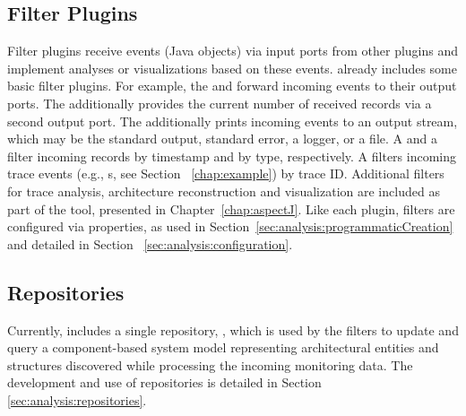 \subsection{Filter Plugins}

Filter plugins receive events (Java objects) via input ports from other %
plugins and implement analyses or visualizations based on these events. %
\Kieker{} already includes some basic filter plugins. For example, the %
 and   forward incoming events %
to their output ports. The  additionally provides the %
current number of received records via a second output port. The  %
additionally prints incoming events to an output stream, which may be %
the standard output, standard error, a logger, or a file. %
A  and a  filter incoming records by %
timestamp and by type, respectively. A  filters incoming %
trace events (e.g., s, see Section~%
\ref{chap:example}) by trace ID. Additional filters for trace analysis, %
architecture reconstruction and visualization are included as part of %
the \KiekerTraceAnalysis{} tool, presented in Chapter~\ref{chap:aspectJ}. %
Like each plugin, filters are configured %
via properties, as used in Section~\ref{sec:analysis:programmaticCreation} and %
detailed in Section~%
\ref{sec:analysis:configuration}. %

%

%


\subsection{Repositories}

Currently, \Kieker{} includes a single repository, , %
which is used by the \KiekerTraceAnalysis{} filters to update and query %
a component-based system model representing architectural entities %
and structures discovered while processing the incoming monitoring data. %
The development and use of repositories is detailed in Section~%
\ref{sec:analysis:repositories}. %

